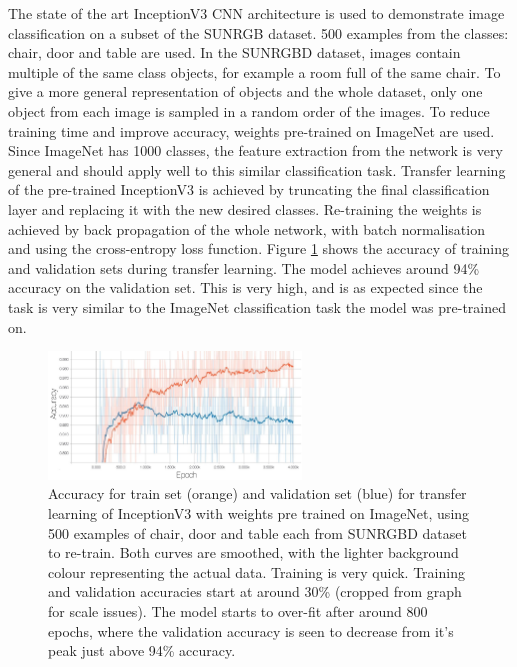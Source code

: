 \documentclass[11pt]{article}
\begin{document}
The state of the art InceptionV3 \cite{incepV3} CNN architecture is used to demonstrate image classification on a subset of the SUNRGB dataset. 500 examples from the classes: chair, door and table are used. In the SUNRGBD dataset, images contain multiple of the same class objects, for example a room full of the same chair. To give a more general representation of objects and the whole dataset, only one object from each image is sampled in a random order of the images. To reduce training time and improve accuracy, weights pre-trained on ImageNet are used. Since ImageNet has 1000 classes, the feature extraction from the network is very general and should apply well to this similar classification task. Transfer learning of the pre-trained InceptionV3 is achieved by truncating the final classification layer and replacing it with the new desired classes. Re-training the weights is achieved by back propagation of the whole network, with batch normalisation and using the cross-entropy loss function. Figure \ref{fig:incept_trans} shows the accuracy of training and validation sets during transfer learning. The model achieves around 94\% accuracy on the validation set. This is very high, and is as expected since the task is very similar to the ImageNet classification task the model was pre-trained on.

\begin{figure}[H]
  \begin{center}
    \includegraphics[width=0.6\textwidth]{images/inception_SUNRGBD.jpg}
  \end{center}
  \caption{Accuracy for train set (orange) and validation set (blue) for transfer learning of InceptionV3 with weights pre trained on ImageNet, using 500 examples of chair, door and table each from SUNRGBD dataset to re-train. Both curves are smoothed, with the lighter background colour representing the actual data. Training is very quick. Training and validation accuracies start at around 30\% (cropped from graph for scale issues). The model starts to over-fit after around 800 epochs, where the validation accuracy is seen to decrease from it's peak just above 94\% accuracy.}
  \label{fig:incept_trans}
\end{figure}




\end{document}
